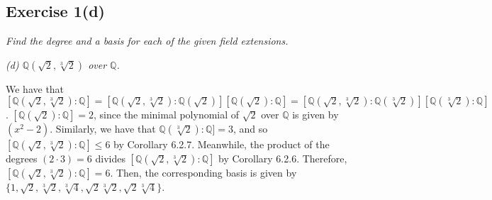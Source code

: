 \subsection*{Exercise 1(d)}
\textit{Find the degree and a basis for each of the given field extensions.}

\textit{(d) $\mathbb{Q}(\sqrt{2},\sqrt[3]{2})$ over $\mathbb{Q}$.}

\vspace{5 mm}
We have that $[\mathbb{Q}(\sqrt{2},\sqrt[3]{2}):\mathbb{Q}] = [\mathbb{Q}(\sqrt{2},\sqrt[3]{2}):\mathbb{Q}(\sqrt{2})][\mathbb{Q}(\sqrt{2}): \mathbb{Q}] = [\mathbb{Q}(\sqrt{2},\sqrt[3]{2}):\mathbb{Q}(\sqrt[3]{2})][\mathbb{Q}(\sqrt[3]{2}): \mathbb{Q}]$. $[\mathbb{Q}(\sqrt{2}): \mathbb{Q}] = 2$, since the minimal polynomial of $\sqrt{2}$ over $\mathbb{Q}$ is given by  $(x^2 - 2)$. Similarly, we have that $\mathbb{Q}(\sqrt[3]{2}): \mathbb{Q}] = 3$, and so $[\mathbb{Q}(\sqrt{2},\sqrt[3]{2}):\mathbb{Q}] \le 6$ by Corollary 6.2.7. Meanwhile, the product of the degrees $(2\cdot3) = 6$ divides $[\mathbb{Q}(\sqrt{2},\sqrt[3]{2}):\mathbb{Q}]$ by Corollary 6.2.6. Therefore, $[\mathbb{Q}(\sqrt{2},\sqrt[3]{2}):\mathbb{Q}] = 6$. Then, the corresponding basis is given by $\{1, \sqrt{2}, \sqrt[3]{2}, \sqrt[3]{4}, \sqrt{2}\sqrt[3]{2}, \sqrt{2}\sqrt[3]{4} \}$.